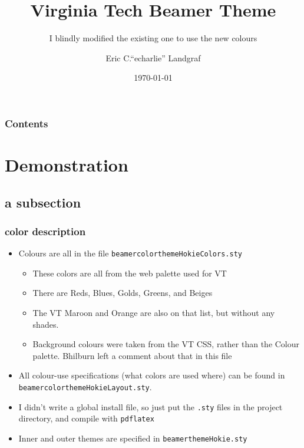 \documentclass[aspectratio=1610,bigger,utf8]{beamer}
\title{Virginia Tech Beamer Theme}
\subtitle{I blindly modified the existing one to use the new colours}
\author{Eric C.``echarlie'' Landgraf}
\institute{NI\&S}
\date{\today}
\begin{document}
\frame{\titlepage}

\begin{frame}
	\frametitle{Contents}
	\tableofcontents[hideallsubsections]

\end{frame}

\section{Demonstration}
\subsection{a subsection}
\begin{frame}
	\frametitle{color description}
	\begin{itemize}
		\item Colours are all in the file \texttt{beamercolorthemeHokieColors.sty}
			\begin{itemize}
				\item These colors are all from the web palette used for VT
				\item There are Reds, Blues, Golds, Greens, and Beiges
				\item The VT Maroon and Orange are also on that list, but without
					any shades.
				\item Background colours were taken from the VT CSS, rather than
					the Colour palette. Bhilburn left a comment about that
					in this file
			\end{itemize}
		\item All colour-use specifications (what colors are used where) can be found in
			\texttt{beamercolorthemeHokieLayout.sty}.
		\item I didn't write a global install file, so just put the \texttt{.sty} files
			in the project directory, and compile with \texttt{pdflatex}
		\item Inner and outer themes are specified in \texttt{beamerthemeHokie.sty}
	\end{itemize}
\end{frame}
\end{document}

